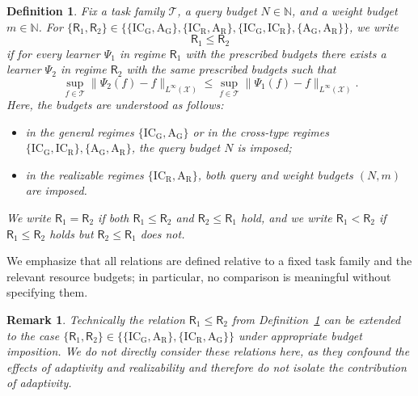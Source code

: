 \documentclass{article}
\newtheorem{definition}{Definition}[section]
\newtheorem{remark}{Remark}[section]
\newcommand{\ICG}{\mathrm{IC_G}}
\newcommand{\ICR}{\mathrm{IC_R}}
\newcommand{\AG}{\mathrm{A_G}}
\newcommand{\AR}{\mathrm{A_R}}
\begin{document}
\begin{definition} \label{def:formalDefRelations}
Fix a task family $\mathcal{T}$, a query budget $N\in\mathbb N$, and a weight budget $m\in\mathbb N$.
For $\{\mathsf R_1,\mathsf R_2\}\in \{\{\ICG,\AG\}, \{\ICR, \AR\}, \{\ICG,\ICR\}, \{\AG, \AR\}\}$, we write
\begin{equation*} 
    \mathsf R_1\leq \mathsf R_2
\end{equation*}
if for every learner $\Psi_1$ %
in regime $\mathsf R_1$ with the prescribed budgets there exists a learner $\Psi_2$ %
in regime $\mathsf R_2$ with the same prescribed budgets such that
\[
\sup_{f\in\mathcal T}\|\Psi_2(f)-f\|_{L^{\infty}(\mathcal X)}
\leq
\sup_{f\in\mathcal T}\|\Psi_1(f)-f\|_{L^{\infty}(\mathcal X)}.
\]
Here, the budgets are understood as follows: 
\begin{itemize}
    \item in the general regimes $\{\ICG, \AG\}$ or in the cross-type regimes $\{\ICG,\ICR\}, \{\AG, \AR\}$, the query budget $N$ is imposed;
    \item in the realizable regimes $\{\ICR, \AR\}$, both query and weight budgets $(N,m)$ are imposed.
\end{itemize}
We write $\mathsf R_1=\mathsf R_2$ if both $\mathsf R_1\leq \mathsf R_2$ and $\mathsf R_2\leq \mathsf R_1$ hold, and we write $\mathsf R_1<\mathsf R_2$ if $\mathsf R_1\leq \mathsf R_2$ holds but $\mathsf R_2\leq \mathsf R_1$ does not.
\end{definition}

We emphasize that all relations are defined relative to a fixed task family and the relevant resource budgets; in particular, no comparison is meaningful without specifying them.

\begin{remark}
Technically the relation $\mathsf R_1\leq \mathsf R_2$ from Definition~\ref{def:formalDefRelations} can be extended to the case $\{\mathsf R_1,\mathsf R_2\}\in \{\{\ICG,\AR\}, \{\ICR, \AG\}\}$ under appropriate budget imposition. We do not directly consider these relations here, as they confound the effects of adaptivity and realizability and therefore do not isolate the contribution of adaptivity.
\end{remark}
\end{document}
